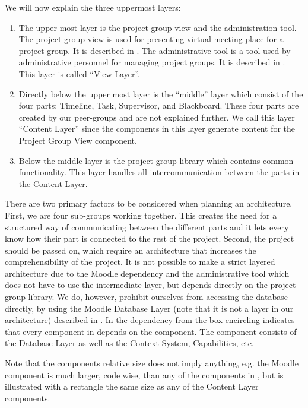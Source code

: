 We will now explain the three uppermost layers:
\begin{enumerate}
	\item The upper most layer is the project group view and the administration tool.
	The project group view is used for presenting virtual meeting place for a project group.
	It is described in .
	The administrative tool is a tool used by administrative personnel for managing project groups.
	It is described in .
	This layer is called ``View Layer''.
	\item Directly below the upper most layer is the ``middle'' layer which consist of the four parts: Timeline, Task, Supervisor, and Blackboard.
	These four parts are created by our peer-groups and are not explained further.
	We call this layer ``Content Layer'' since the components in this layer generate content for the Project Group View component.
	\item Below the middle layer is the project group library which contains common functionality.
	This layer handles all intercommunication between the parts in the Content Layer.  
\end{enumerate}


There are two primary factors to be considered when planning an architecture. 
First, we are four sub-groups working together. 
This creates the need for a structured way of communicating between the different parts and it lets every \subgroup{} know how their part is connected to the rest of the project. 
Second, the project should be passed on, which require an architecture that increases the comprehensibility of the project.
It is not possible to make a strict layered architecture due to the Moodle dependency and the administrative tool which does not have to use the intermediate layer, but depends directly on the project group library.
We do, however, prohibit ourselves from accessing the database directly, by using the Moodle Database Layer (note that it is not a layer in our architecture) described in .
In  the dependency from the box encircling \system{} indicates that every component in \system{} depends on the \moodle{} component.
The \moodle{} component consists of the Database Layer as well as the Context System, Capabilities, etc.

Note that the components relative size does not imply anything, e.g. the Moodle component is much larger, code wise, than any of the components in \system{}, but is illustrated with a rectangle the same size as any of the Content Layer components.













